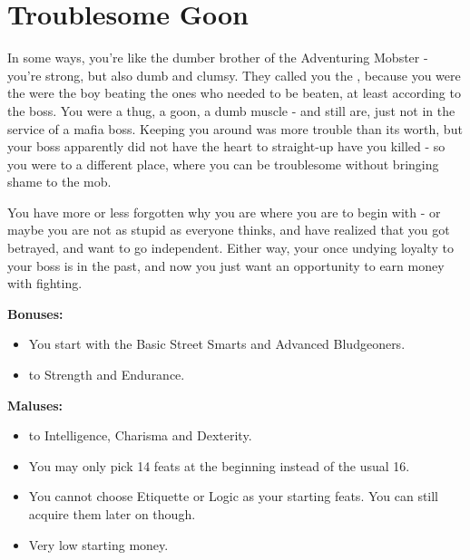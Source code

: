 \section{Troublesome Goon}
In some ways, you're like the dumber brother of the Adventuring Mobster - you're strong, but also dumb and clumsy. They called you the  , because you were the were the boy beating the ones who needed to be beaten, at least according to the boss. You were a thug, a goon, a dumb muscle - and still are, just not in the service of a mafia boss. Keeping you around was more trouble than its worth, but your boss apparently did not have the heart to straight-up have you killed - so you were  to a different place, where you can be troublesome without bringing shame to the mob.

You have more or less forgotten why you are where you are to begin with - or maybe you are not as stupid as everyone thinks, and have realized that you got betrayed, and want to go independent. Either way, your once undying loyalty to your boss is in the past, and now you just want an opportunity to earn money with fighting.

\textbf{Bonuses:}
\begin{itemize}
	\item You start with the Basic Street Smarts and Advanced Bludgeoners.
	\item {} to Strength and Endurance.
\end{itemize}


\textbf{Maluses:}
\begin{itemize}
	\item {} to Intelligence, Charisma and Dexterity.
	\item You may only pick 14 feats at the beginning instead of the usual 16.
	\item You cannot choose Etiquette or Logic as your starting feats. You can still acquire them later on though.
	\item Very low starting money.
\end{itemize}
